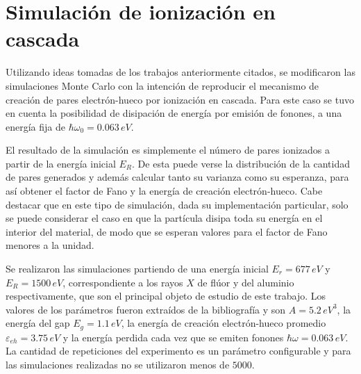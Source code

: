 \section{Simulación de ionización en cascada}
\noindent Utilizando ideas tomadas de los trabajos anteriormente citados, se modificaron las simulaciones Monte Carlo con la intención de reproducir el mecanismo de creación de pares electrón-hueco por ionización en cascada. Para este caso se tuvo en cuenta la posibilidad de disipación de energía por emisión de fonones, a una energía fija de $\hbar\omega_{0} = 0.063\,\si{eV}$.

El resultado de la simulación es simplemente el número de pares 
ionizados a partir de la energía inicial $E_{R}$. De esta puede verse la distribución de la cantidad de pares generados y además calcular tanto su varianza como su esperanza, para así obtener el factor de Fano y la energía de creación electrón-hueco.
Cabe destacar que en este tipo de simulación, dada su implementación particular, solo se puede considerar el caso en que la partícula disipa toda su energía en el interior del material, de modo que se esperan valores para el factor de Fano menores a la unidad.

Se realizaron las simulaciones partiendo de una energía inicial $E_{r} = 677\,\si{eV}$ y $E_{R} = 1500\,\si{eV}$, correspondiente a los rayos $X$ de flúor y del aluminio respectivamente, que son el principal objeto de estudio de este trabajo. Los valores de los parámetros fueron extraídos de la bibliografía\cite{Alig, Ramanathan} y son $A = 5.2\,\si{eV}^{3}$, la energía del gap $E_{g} = 1.1\,\si{eV}$, la energía de creación electrón-hueco promedio $\varepsilon_{eh} = 3.75\,\si{eV}$ y la energía perdida cada vez que se emiten fonones $\hbar \omega = 0.063\,\si{eV}$. La cantidad de repeticiones del experimento es un parámetro configurable y para las simulaciones realizadas no se utilizaron menos de $5000$. %

